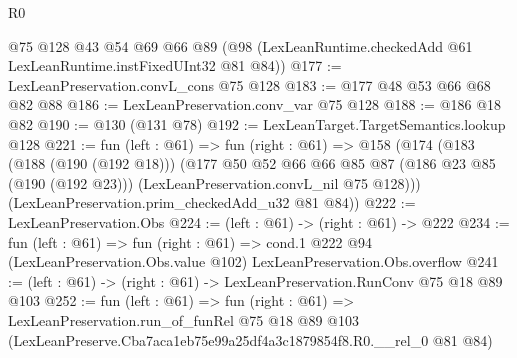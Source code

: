 \begin{lexlean}{R0}
\begin{coremodule}
    @75
    @128
    @43
    @54
    @69
    @66
    @89
    (@98 (LexLeanRuntime.checkedAdd @61 LexLeanRuntime.instFixedUInt32 @81 @84))
@177 := LexLeanPreservation.convL_cons @75 @128
@183 := @177 @48 @53 @66 @68 @82 @88
@186 := LexLeanPreservation.conv_var @75 @128
@188 := @186 @18 @82
@190 := @130 (@131 @78)
@192 := LexLeanTarget.TargetSemantics.lookup @128
@221 := fun (left : @61) =>
  fun (right : @61) =>
  @158
    (@174
      (@183
        (@188 (@190 (@192 @18)))
        (@177
          @50
          @52
          @66
          @66
          @85
          @87
          (@186 @23 @85 (@190 (@192 @23)))
          (LexLeanPreservation.convL_nil @75 @128)))
      (LexLeanPreservation.prim_checkedAdd_u32 @81 @84))
@222 := LexLeanPreservation.Obs
@224 := (left : @61) -> (right : @61) -> @222
@234 := fun (left : @61) =>
  fun (right : @61) =>
  cond.{1} @222 @94 (LexLeanPreservation.Obs.value @102) LexLeanPreservation.Obs.overflow
@241 := (left : @61) -> (right : @61) -> LexLeanPreservation.RunConv @75 @18 @89 @103
@252 := fun (left : @61) =>
  fun (right : @61) =>
  LexLeanPreservation.run_of_funRel
    @75
    @18
    @89
    @103
    (LexLeanPreserve.Cba7aca1eb75e99a25df4a3c1879854f8.R0.__rel_0 @81 @84)
\end{coremodule}
\end{lexlean}

